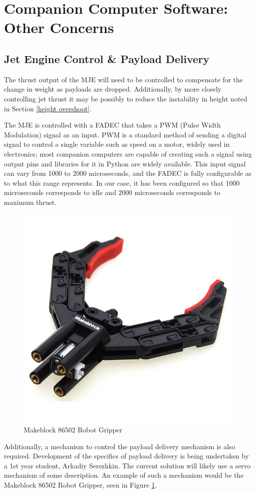 \documentclass[11pt]{article}
\begin{document}
\section{Companion Computer Software: Other Concerns}
\subsection{Jet Engine Control \& Payload Delivery}
The thrust output of the MJE will need to be controlled to compensate for the change in weight as payloads are dropped. Additionally, by more closely controlling jet thrust it may be possibly to reduce the instability in height noted in Section \ref{height overshoot}.

The MJE is controlled with a FADEC that takes a PWM (Pulse Width Modulation) signal as an input. PWM is a standard method of sending a digital signal to control a single variable such as speed on a motor, widely used in electronics; most companion computers are capable of creating such a signal using output pins and libraries for it in Python are widely available. This input signal can vary from 1000 to 2000 microseconds, and the FADEC is fully configurable as to what this range represents. In our case, it has been configured so that 1000 microseconds corresponds to idle and 2000 microseconds corresponds to maximum thrust.

\begin{figure}
    \begin{center}
        \includegraphics[width=0.48\linewidth]{makeblock_gripper}
        \caption{Makeblock 86502 Robot Gripper}
        \label{fig:makeblock_gripper}
    \end{center}
\end{figure}

Additionally, a mechanism to control the payload delivery mechanism is also required. Development of the specifics of payload delivery is being undertaken by a 1st year student, Arkadiy Serezhkin. The current solution will likely use a servo mechanism of some description. An example of such a mechanism would be the Makeblock 86502 Robot Gripper\cite{Makeblock_gripper}, seen in Figure \ref{fig:makeblock_gripper}.
\end{document}
